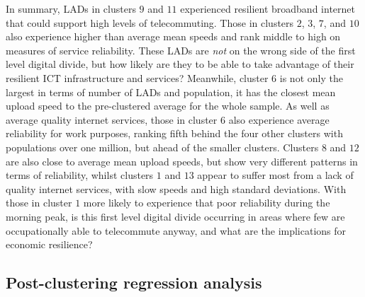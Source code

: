 \documentclass[]{interact}
\theoremstyle{plain}%
\theoremstyle{definition}
\theoremstyle{remark}
\begin{document}
In summary, LADs in clusters \(9\) and \(11\) experienced resilient
broadband internet that could support high levels of telecommuting.
Those in clusters \(2\), \(3\), \(7\), and \(10\) also experience higher
than average mean speeds and rank middle to high on measures of service
reliability. These LADs are \emph{not} on the wrong side of the first
level digital divide, but how likely are they to be able to take
advantage of their resilient ICT infrastructure and services? Meanwhile,
cluster \(6\) is not only the largest in terms of number of LADs and
population, it has the closest mean upload speed to the pre-clustered
average for the whole sample. As well as average quality internet
services, those in cluster \(6\) also experience average reliability for
work purposes, ranking fifth behind the four other clusters with
populations over one million, but ahead of the smaller clusters.
Clusters \(8\) and \(12\) are also close to average mean upload speeds,
but show very different patterns in terms of reliability, whilst
clusters \(1\) and \(13\) appear to suffer most from a lack of quality
internet services, with slow speeds and high standard deviations. With
those in cluster \(1\) more likely to experience that poor reliability
during the morning peak, is this first level digital divide occurring in
areas where few are occupationally able to telecommute anyway, and what
are the implications for economic resilience?

\hypertarget{sec:4.2}{%
\subsection{Post-clustering regression analysis}\label{sec:4.2}}
\end{document}
